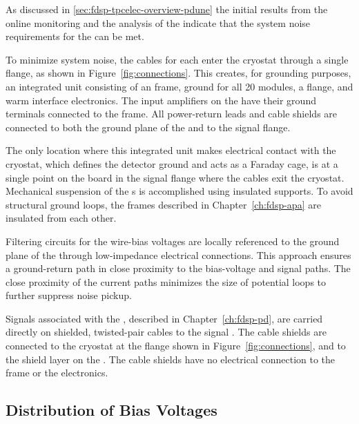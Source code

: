 As discussed in \ref{sec:fdsp-tpcelec-overview-pdune}
the initial results from the online monitoring and the
analysis of the  indicate that the system
noise requirements for the  
can be met.

To minimize system noise, the  cables for each  
enter the cryostat through a single  flange, as shown in 
Figure~\ref{fig:connections}. This creates, for grounding purposes, 
an integrated unit consisting of an  frame, 
ground for all \num{20}  modules, a  flange, and 
warm interface electronics. The input amplifiers on the 
  have their ground terminals connected to 
the  frame. All power-return leads and cable shields are 
connected to both the ground plane of the  and to the 
 signal flange.

The only location where this integrated unit makes electrical contact 
with the cryostat, which defines the detector ground and acts as a 
Faraday cage, is at a single point on the  \fdth board in 
the  signal flange where the cables exit the cryostat. 
Mechanical suspension of the s is accomplished using 
insulated supports. To avoid structural ground loops, the  
frames described in Chapter~\ref{ch:fdsp-apa} are insulated from 
each other.

Filtering circuits for the  wire-bias voltages are 
locally referenced to the ground plane of the  
through low-impedance electrical connections. This approach 
ensures a ground-return path in close proximity to the 
bias-voltage and signal paths. The close proximity of the 
current paths minimizes the size of potential loops to further 
suppress noise pickup.

Signals associated with the , described in 
Chapter~\ref{ch:fdsp-pd}, are carried directly on shielded, 
twisted-pair cables to the signal \fdth. The cable shields 
are connected to the cryostat at the  flange 
shown in Figure~\ref{fig:connections}, and to the  
shield layer on the . The cable shields have no 
electrical connection to the  frame or the 
electronics.

\subsection{Distribution of Bias Voltages}
\label{sec:fdsp-tpcelec-design-bias}

